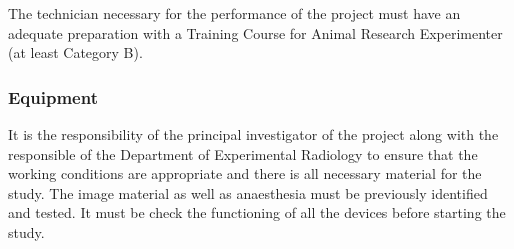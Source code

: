 The technician necessary for the performance of the project must have an adequate preparation with a Training Course for Animal Research Experimenter (at least Category B).

\subsubsection*{Equipment}
It is the responsibility of the principal investigator of the project along with the responsible of the Department of Experimental Radiology to ensure that the working conditions are appropriate and there is all necessary material for the study.
The image material as well as anaesthesia must be previously identified and tested. It must be check the functioning of all the devices before starting the study.
